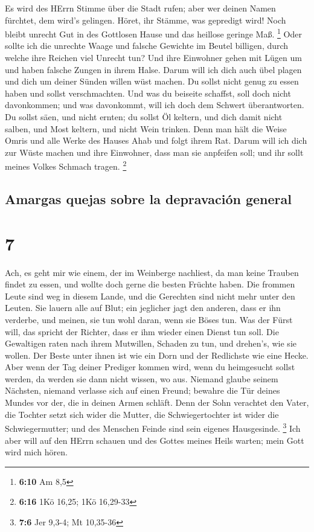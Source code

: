  Es wird des HErrn Stimme über die Stadt rufen; aber wer
deinen Namen fürchtet, dem wird's gelingen. Höret, ihr Stämme, was
gepredigt wird!  Noch bleibt unrecht Gut in des Gottlosen
Hause und das heillose geringe Maß. \footnote{\textbf{6:10} Am 8,5}
 Oder sollte ich die unrechte Waage und falsche Gewichte
im Beutel billigen,  durch welche ihre Reichen viel
Unrecht tun? Und ihre Einwohner gehen mit Lügen um und haben falsche
Zungen in ihrem Halse.  Darum will ich dich auch übel
plagen und dich um deiner Sünden willen wüst machen.  Du
sollst nicht genug zu essen haben und sollst verschmachten. Und was du
beiseite schaffst, soll doch nicht davonkommen; und was davonkommt, will
ich doch dem Schwert überantworten.  Du sollst säen, und
nicht ernten; du sollst Öl keltern, und dich damit nicht salben, und
Most keltern, und nicht Wein trinken.  Denn man hält die
Weise Omris und alle Werke des Hauses Ahab und folgt ihrem Rat. Darum
will ich dich zur Wüste machen und ihre Einwohner, dass man sie
anpfeifen soll; und ihr sollt meines Volkes Schmach tragen. \footnote{\textbf{6:16}
  1Kö 16,25; 1Kö 16,29-33}

\hypertarget{amargas-quejas-sobre-la-depravaciuxf3n-general}{%
\subsection{Amargas quejas sobre la depravación
general}\label{amargas-quejas-sobre-la-depravaciuxf3n-general}}

\hypertarget{section-6}{%
\section{7}\label{section-6}}

 Ach, es geht mir wie einem, der im Weinberge nachliest,
da man keine Trauben findet zu essen, und wollte doch gerne die besten
Früchte haben.  Die frommen Leute sind weg in diesem
Lande, und die Gerechten sind nicht mehr unter den Leuten. Sie lauern
alle auf Blut; ein jeglicher jagt den anderen, dass er ihn verderbe,
 und meinen, sie tun wohl daran, wenn sie Böses tun. Was
der Fürst will, das spricht der Richter, dass er ihm wieder einen Dienst
tun soll. Die Gewaltigen raten nach ihrem Mutwillen, Schaden zu tun, und
drehen's, wie sie wollen.  Der Beste unter ihnen ist wie
ein Dorn und der Redlichste wie eine Hecke. Aber wenn der Tag deiner
Prediger kommen wird, wenn du heimgesucht sollst werden, da werden sie
dann nicht wissen, wo aus.  Niemand glaube seinem
Nächsten, niemand verlasse sich auf einen Freund; bewahre die Tür deines
Mundes vor der, die in deinen Armen schläft.  Denn der
Sohn verachtet den Vater, die Tochter setzt sich wider die Mutter, die
Schwiegertochter ist wider die Schwiegermutter; und des Menschen Feinde
sind sein eigenes Hausgesinde. \footnote{\textbf{7:6} Jer 9,3-4; Mt
  10,35-36}  Ich aber will auf den HErrn schauen und des
Gottes meines Heils warten; mein Gott wird mich hören.

